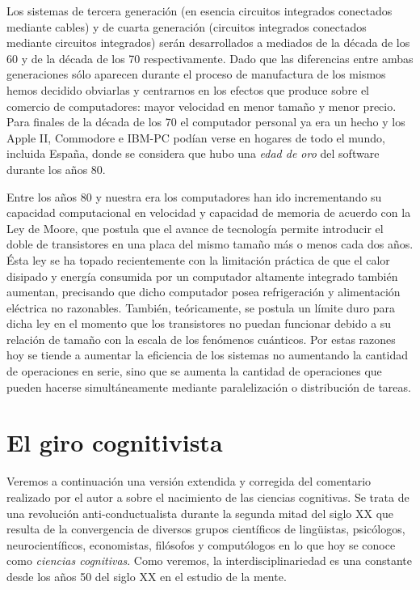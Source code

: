 \documentclass[12pt]{memoir}
\begin{document}
\begin{appendices}
Los sistemas de tercera generación (en esencia circuitos integrados conectados mediante cables) y de cuarta generación (circuitos integrados conectados mediante circuitos integrados) serán desarrollados a mediados de la década de los 60 y de la década de los 70 respectivamente. Dado que las diferencias entre ambas generaciones sólo aparecen durante el proceso de manufactura de los mismos hemos decidido obviarlas y centrarnos en los efectos que produce sobre el comercio de computadores: mayor velocidad en menor tamaño y menor precio. Para finales de la década de los 70 el computador personal ya era un hecho y los Apple II, Commodore e IBM-PC podían verse en hogares de todo el mundo, incluida España, donde se considera que hubo una \textit{edad de oro} del software durante los años 80.

Entre los años 80 y nuestra era los computadores han ido incrementando su capacidad computacional en velocidad y capacidad de memoria de acuerdo con la Ley de Moore, que postula que el avance de tecnología permite introducir el doble de transistores en una placa del mismo tamaño más o menos cada dos años. Ésta ley se ha topado recientemente con la limitación práctica de que el calor disipado y energía consumida por un computador altamente integrado también aumentan, precisando que dicho computador posea refrigeración y alimentación eléctrica no razonables. También, teóricamente, se postula un límite duro para dicha ley en el momento que los transistores no puedan funcionar debido a su relación de tamaño con la escala de los fenómenos cuánticos. Por estas razones hoy se tiende a aumentar la eficiencia de los sistemas no aumentando la cantidad de operaciones en serie, sino que se aumenta la cantidad de operaciones que pueden hacerse simultáneamente mediante paralelización o distribución de tareas.

\chapter{El giro cognitivista}
\label{cognitiveHistory}

Veremos a continuación una versión extendida y corregida del comentario realizado por el autor a \parencite{pmf07} sobre el nacimiento de las ciencias cognitivas. Se trata de una revolución anti-conductualista durante la segunda mitad del siglo XX \parencite{theCognitiveRevolution} que resulta de la convergencia de diversos grupos científicos de lingüistas, psicólogos, neurocientíficos, economistas, filósofos y computólogos en lo que hoy se conoce como \textit{ciencias cognitivas}. Como veremos, la interdisciplinariedad es una constante desde los años 50 del siglo XX en el estudio de la mente.


\end{appendices}
\end{document}
